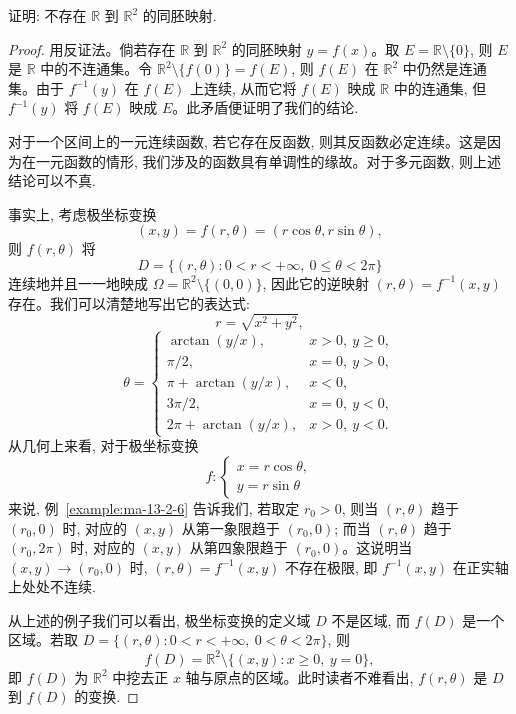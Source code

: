 \begin{example}\label{example:ma-13-3-4}
证明: 不存在 $\mathbb R$ 到 $\mathbb R^2$ 的同胚映射.
\end{example}


\begin{proof}
用反证法。倘若存在 $\mathbb R$ 到 $\mathbb R^2$ 的同胚映射 $y=f(x)$。取 $E=\mathbb R\setminus\{0\}$, 则 $E$ 是 $\mathbb R$ 中的不连通集。令 $\mathbb R^2\setminus\{f(0)\}=f(E)$, 则 $f(E)$ 在 $\mathbb R^2$ 中仍然是连通集。由于 $f^{-1}(y)$ 在 $f(E)$ 上连续, 从而它将 $f(E)$ 映成 $\mathbb R$ 中的连通集, 但 $f^{-1}(y)$ 将 $f(E)$ 映成 $E$。此矛盾便证明了我们的结论.

对于一个区间上的一元连续函数, 若它存在反函数, 则其反函数必定连续。这是因为在一元函数的情形, 我们涉及的函数具有单调性的缘故。对于多元函数, 则上述结论可以不真.

事实上, 考虑极坐标变换
\[
  (x,y)=f(r,\theta)=(r\cos\theta,r\sin\theta),
\]
则 $f(r,\theta)$ 将
\[
  D=\{(r,\theta):0<r<+\infty,\ 0\leqslant\theta<2\pi\}
\]
连续地并且一一地映成 $\Omega=\mathbb R^2\setminus\{(0,0)\}$, 因此它的逆映射 $(r,\theta)=f^{-1}(x,y)$ 存在。我们可以清楚地写出它的表达式:
\[
  r=\sqrt{x^2+y^2},
\]
\[
  \theta=
  \begin{cases}
    \arctan(y/x), & x>0,\ y\geqslant0,\\
    \pi/2, & x=0,\ y>0,\\
    \pi+\arctan(y/x), & x<0,\\
    3\pi/2, & x=0,\ y<0,\\
    2\pi+\arctan(y/x), & x>0,\ y<0.
  \end{cases}
\]
从几何上来看, 对于极坐标变换
\[
  f:
  \begin{cases}
    x=r\cos\theta,\\
    y=r\sin\theta
  \end{cases}
\]
来说, 例~\ref{example:ma-13-2-6} 告诉我们, 若取定 $r_0>0$, 则当 $(r,\theta)$ 趋于 $(r_0,0)$ 时, 对应的 $(x,y)$ 从第一象限趋于 $(r_0,0)$; 而当 $(r,\theta)$ 趋于 $(r_0,2\pi)$ 时, 对应的 $(x,y)$ 从第四象限趋于 $(r_0,0)$。这说明当 $(x,y)\to(r_0,0)$ 时, $(r,\theta)=f^{-1}(x,y)$ 不存在极限, 即 $f^{-1}(x,y)$ 在正实轴上处处不连续.

从上述的例子我们可以看出, 极坐标变换的定义域 $D$ 不是区域, 而 $f(D)$ 是一个区域。若取 $D=\{(r,\theta):0<r<+\infty,\ 0<\theta<2\pi\}$, 则
\[
  f(D)=\mathbb R^2\setminus\{(x,y):x\geqslant0,\ y=0\},
\]
即 $f(D)$ 为 $\mathbb R^2$ 中挖去正 $x$ 轴与原点的区域。此时读者不难看出, $f(r,\theta)$ 是 $D$ 到 $f(D)$ 的变换.
\end{proof}


